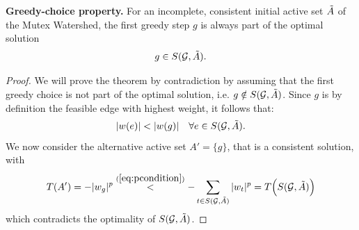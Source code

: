 \begin{lemma} \label{theo:greedy_choice}
\textbf{Greedy-choice property.}
For an incomplete, consistent initial active set $\tilde{A}$ of the Mutex Watershed, the first greedy step $g$ is always part of the optimal solution $$ g \in S(\mathcal{G},\tilde{A}).$$%
\end{lemma}
\begin{proof}

\noindent We will prove the theorem by contradiction by assuming that the first greedy choice is not part of the optimal solution, i.e. $g \notin S(\mathcal{G},\tilde{A})$. 
Since $g$ is by definition the feasible edge with highest weight, it follows that:
\begin{equation}
|w(e)| < |w(g)| \quad \forall e \in \subproblem(\mathcal{G},\Ainit).%
\end{equation}
\noindent We now consider the alternative active set $A' = \{g\}$, that is a consistent solution, with 
\begin{equation}
T(A') = -|w_g|^p \overset{(\ref{eq:pcondition})}{<} -\sum_{t \in S(\mathcal{G},\tilde{A})} |w_t|^p = T\Big(S(\mathcal{G},\tilde{A})\Big)
\end{equation}
which contradicts the optimality of $S(\mathcal{G},\tilde{A})$.
\end{proof}




